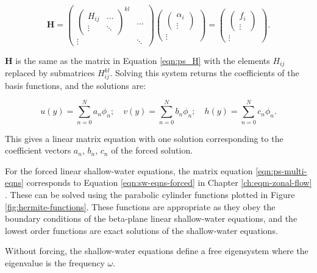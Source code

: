 \begin{equation}
    \textbf{H} =
  \begin{pmatrix}
    \begin{pmatrix}
H_{ij} & \dots \\
\vdots & \ddots
    \end{pmatrix}^{kl} & \dots \\
  \vdots & \ddots
  \end{pmatrix}
  \begin{pmatrix}
    \begin{pmatrix}
    \alpha_{i} \\
    \vdots
    \end{pmatrix} \\
  \vdots
  \end{pmatrix}
  =
  \begin{pmatrix}
    \begin{pmatrix}
    f_{i} \\
    \vdots
    \end{pmatrix} \\
  \vdots
  \end{pmatrix}.
\end{equation}

$\textbf{H}$ is the same as the matrix in Equation \ref{eqn:ps_H} with the elements $H_{ij}$ replaced by submatrices $H^{kl}_{ij}$. Solving this system returns the coefficients of the basis functions, and the solutions are:

\begin{equation}\label{eqn:ps-coeff-solutions}
 u(y) = \sum_{n=0}^{N} a_{n} \phi_{n}
; \quad
 v(y) = \sum_{n=0}^{N} b_{n} \phi_{n}
; \quad
 h(y) = \sum_{n=0}^{N} c_{n} \phi_{n}.
\end{equation}


This gives a linear matrix equation with one solution corresponding to the coefficient vectors $a_{n}$, $b_{n}$, $c_{n}$ of the forced solution.

For the forced linear shallow-water equations, the matrix equation \ref{eqn:ps-multi-eqns} corresponds to Equation \ref{eqn:sw-eqns-forced} in Chapter \ref{ch:eqm-zonal-flow} \citep{matsuno1966quasi}. These can be solved using the parabolic cylinder functions plotted in Figure \ref{fig:hermite-functions}. These functions are appropriate as they obey the boundary conditions of the beta-plane linear shallow-water equations, and the lowest order functions are exact solutions of the shallow-water equations.

Without forcing, the shallow-water equations define a free eigensystem where the eigenvalue is the frequency $\omega$.

